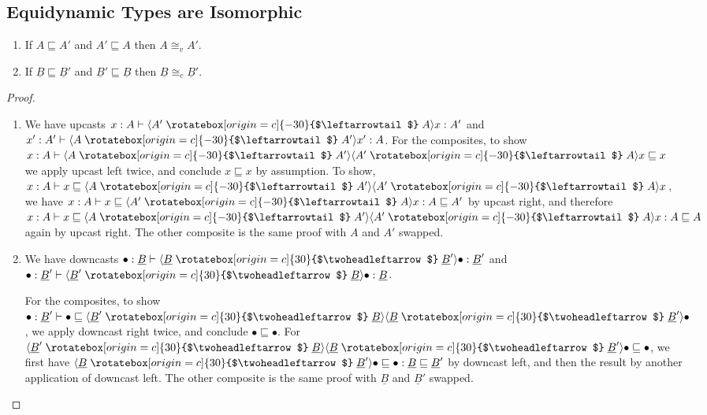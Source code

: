 \documentclass[acmsmall,nonacm]{acmart}
\renewcommand{\u}{\underline}
\newcommand{\ltdyn}{\sqsubseteq}
\newcommand{\uarrow}{\mathrel{\rotatebox[origin=c]{-30}{$\leftarrowtail$}}}
\newcommand{\darrow}{\mathrel{\rotatebox[origin=c]{30}{$\twoheadleftarrow$}}}
\newcommand{\upcast}[2]{\langle{#2}\uarrow{#1}\rangle}
\newcommand{\dncast}[2]{\langle{#1}\darrow{#2}\rangle}
\begin{document}
\begin{longonly}
\subsection{Equidynamic Types are Isomorphic}

\begin{theorem} 
  \begin{enumerate}
  \item
    If $A \ltdyn A'$ and $A' \ltdyn A$ then $A \cong_v A'$.
  \item
    If $\u B \ltdyn \u B'$ and $\u B' \ltdyn \u B$ then $\u B \cong_c \u B'$.
  \end{enumerate}
\end{theorem}
\begin{proof}
  \begin{enumerate}
  \item We have upcasts $x : A \vdash \upcast{A}{A'}{x} : A'$ and $x' : A' \vdash \upcast{A'}{A}{x'} : A$.
    For the composites, to show
    $x : A \vdash \upcast{A'}{A}{\upcast{A}{A'}{x}} \ltdyn x$
    we apply upcast left twice, and conclude $x \ltdyn x$ by assumption.
    To show, 
    $x : A \vdash x \ltdyn \upcast{A'}{A}{\upcast{A}{A'}{x}}$,
    we have $x : A \vdash x \ltdyn {\upcast{A}{A'}{x}} : A \ltdyn A'$
    by upcast right, and therefore
    $x : A \vdash x \ltdyn \upcast{A'}{A}{\upcast{A}{A'}{x}} : A \ltdyn A$
    again by upcast right.
    The other composite is the same proof with $A$ and $A'$ swapped.
    
  \item We have downcasts $\bullet : \u B \vdash \dncast{\u B}{\u B'}{\bullet} : \u B'$ and
    $\bullet : \u B' \vdash \dncast{\u B'}{\u B}{\bullet} : \u B$.

      For the composites, to show $\bullet : \u B' \vdash \bullet \ltdyn
      \dncast{\u B'}{\u B}{\dncast{\u B}{\u B'}}{\bullet}$, we apply
      downcast right twice, and conclude $\bullet \ltdyn \bullet$.  For
      $\dncast{\u B'}{\u B}{\dncast{\u B}{\u B'}}{\bullet} \ltdyn
      \bullet$, we first have $\dncast{\u B}{\u B'}{\bullet} \ltdyn
      \bullet : \u B \ltdyn \u B'$ by downcast left, and then the result
      by another application of downcast left.
      The other composite is the same proof with $\u B$ and $\u B'$ swapped.
  \end{enumerate}
\end{proof}
\end{longonly}
\end{document}
